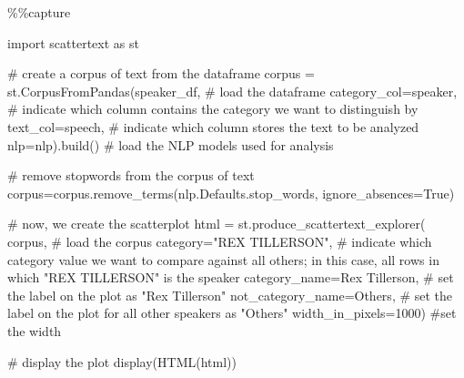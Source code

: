 \documentclass[
  letterpaper,
  DIV=11,
  numbers=noendperiod]{scrreprt}
\newenvironment{Shaded}{\begin{snugshade}}{\end{snugshade}}
\newcommand{\CommentTok}[1]{\textcolor[rgb]{0.37,0.37,0.37}{#1}}
\newcommand{\DecValTok}[1]{\textcolor[rgb]{0.68,0.00,0.00}{#1}}
\newcommand{\ImportTok}[1]{\textcolor[rgb]{0.00,0.46,0.62}{#1}}
\newcommand{\NormalTok}[1]{\textcolor[rgb]{0.00,0.23,0.31}{#1}}
\newcommand{\OperatorTok}[1]{\textcolor[rgb]{0.37,0.37,0.37}{#1}}
\newcommand{\StringTok}[1]{\textcolor[rgb]{0.13,0.47,0.30}{#1}}
\newcommand{\VariableTok}[1]{\textcolor[rgb]{0.07,0.07,0.07}{#1}}
\begin{document}
\begin{Shaded}
\begin{Highlighting}[]
\OperatorTok{\%\%}\NormalTok{capture}

\ImportTok{import}\NormalTok{ scattertext }\ImportTok{as}\NormalTok{ st}

\CommentTok{\# create a corpus of text from the dataframe }
\NormalTok{corpus }\OperatorTok{=}\NormalTok{ st.CorpusFromPandas(speaker\_df, }\CommentTok{\# load the dataframe }
\NormalTok{                             category\_col}\OperatorTok{=}\StringTok{\textquotesingle{}speaker\textquotesingle{}}\NormalTok{, }\CommentTok{\# indicate which column contains the category we want to distinguish by }
\NormalTok{                             text\_col}\OperatorTok{=}\StringTok{\textquotesingle{}speech\textquotesingle{}}\NormalTok{, }\CommentTok{\# indicate which column stores the text to be analyzed}
\NormalTok{                             nlp}\OperatorTok{=}\NormalTok{nlp).build() }\CommentTok{\# load the NLP models used for analysis }

\CommentTok{\# remove stopwords from the corpus of text}
\NormalTok{corpus}\OperatorTok{=}\NormalTok{corpus.remove\_terms(nlp.Defaults.stop\_words, ignore\_absences}\OperatorTok{=}\VariableTok{True}\NormalTok{)}

\CommentTok{\# now, we create the scatterplot }
\NormalTok{html }\OperatorTok{=}\NormalTok{ st.produce\_scattertext\_explorer(}
\NormalTok{                   corpus, }\CommentTok{\# load the corpus }
\NormalTok{                   category}\OperatorTok{=}\StringTok{"REX TILLERSON"}\NormalTok{, }\CommentTok{\# indicate which category value we want to compare against all others; in this case, all rows in which "REX TILLERSON" is the speaker}
\NormalTok{                   category\_name}\OperatorTok{=}\StringTok{\textquotesingle{}Rex Tillerson\textquotesingle{}}\NormalTok{, }\CommentTok{\# set the label on the plot as "Rex Tillerson"}
\NormalTok{                   not\_category\_name}\OperatorTok{=}\StringTok{\textquotesingle{}Others\textquotesingle{}}\NormalTok{, }\CommentTok{\# set the label on the plot for all other speakers as "Others"}
\NormalTok{                   width\_in\_pixels}\OperatorTok{=}\DecValTok{1000}\NormalTok{) }\CommentTok{\#set the width }
\end{Highlighting}
\end{Shaded}

\begin{Shaded}
\begin{Highlighting}[]
\CommentTok{\# display the plot                   }
\NormalTok{display(HTML(html))}
\end{Highlighting}
\end{Shaded}
\end{document}

